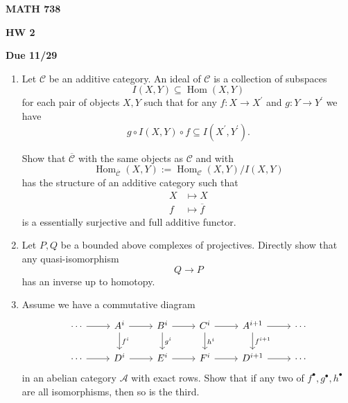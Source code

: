 \documentclass[12pt]{amsart}
\begin{document}
\centerline{\bf MATH 738}
\centerline{\bf HW 2} 
\centerline{\bf Due 11/29}

\vspace{2em}

\begin{enumerate}
    
    \item Let $\mathcal C$ be an additive category. An ideal of $\mathcal C$ is a collection of 
    subspaces 
    \begin{displaymath}
        I(X,Y) \subseteq \operatorname{Hom}(X,Y)
    \end{displaymath} 
    for each pair of objects $X,Y$ such that for any $f: X \to X^\prime$ and $g: Y \to Y^\prime$ 
    we have 
    \begin{displaymath}
        g \circ I(X,Y) \circ f \subseteq I(X^\prime,Y^\prime).
    \end{displaymath}

    Show that $\overline{\mathcal C}$ with the same objects as $\mathcal C$ and with 
    \begin{displaymath}
        \operatorname{Hom}_{\overline{\mathcal C}}(X,Y) := \operatorname{Hom}_{\mathcal C}(X,Y)/I(X,Y)
    \end{displaymath}
    has the structure of an additive category such that 
    \begin{align*}
        X & \mapsto X \\
        f & \mapsto \overline{f}
    \end{align*}
    is a essentially surjective and full additive functor. 

    \item Let $P,Q$ be a bounded above complexes of projectives. Directly show that any quasi-isomorphism 
    \begin{displaymath}
        Q \to P 
    \end{displaymath}
    has an inverse up to homotopy. 

    \item Assume we have a commutative diagram 
    \begin{equation*}
        \begin{tikzcd}
            \cdots \ar[r] & A^i \ar[r] \ar[d,"f^i"] & B^i \ar[r] \ar[d,"g^i"] & C^i \ar[r] \ar[d,"h^i"] & A^{i+1} \ar[r] \ar[d,"f^{i+1}"] & \cdots \\
            \cdots \ar[r] & D^i \ar[r] & E^i \ar[r] & F^i \ar[r] & D^{i+1} \ar[r] & \cdots
        \end{tikzcd}
    \end{equation*}
    in an abelian category $\mathcal A$ with exact rows. Show that if any two of $f^\bullet, g^\bullet, h^\bullet$ are all isomorphisms, then so is the third. 
    

\end{enumerate}
\end{document}

